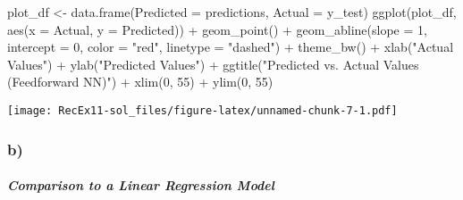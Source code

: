 \documentclass[
]{article}
\newenvironment{Shaded}{\begin{snugshade}}{\end{snugshade}}
\newcommand{\AttributeTok}[1]{\textcolor[rgb]{0.77,0.63,0.00}{#1}}
\newcommand{\DecValTok}[1]{\textcolor[rgb]{0.00,0.00,0.81}{#1}}
\newcommand{\FunctionTok}[1]{\textcolor[rgb]{0.00,0.00,0.00}{#1}}
\newcommand{\NormalTok}[1]{#1}
\newcommand{\OtherTok}[1]{\textcolor[rgb]{0.56,0.35,0.01}{#1}}
\newcommand{\SpecialCharTok}[1]{\textcolor[rgb]{0.00,0.00,0.00}{#1}}
\newcommand{\StringTok}[1]{\textcolor[rgb]{0.31,0.60,0.02}{#1}}
\begin{document}
\begin{Shaded}
\begin{Highlighting}[]
\NormalTok{plot\_df }\OtherTok{\textless{}{-}} \FunctionTok{data.frame}\NormalTok{(}\AttributeTok{Predicted =}\NormalTok{ predictions, }\AttributeTok{Actual =}\NormalTok{ y\_test)}
\FunctionTok{ggplot}\NormalTok{(plot\_df, }\FunctionTok{aes}\NormalTok{(}\AttributeTok{x =}\NormalTok{ Actual, }\AttributeTok{y =}\NormalTok{ Predicted)) }\SpecialCharTok{+}
  \FunctionTok{geom\_point}\NormalTok{() }\SpecialCharTok{+}
  \FunctionTok{geom\_abline}\NormalTok{(}\AttributeTok{slope =} \DecValTok{1}\NormalTok{, }\AttributeTok{intercept =} \DecValTok{0}\NormalTok{, }\AttributeTok{color =} \StringTok{"red"}\NormalTok{, }\AttributeTok{linetype =} \StringTok{"dashed"}\NormalTok{) }\SpecialCharTok{+}
  \FunctionTok{theme\_bw}\NormalTok{() }\SpecialCharTok{+}
  \FunctionTok{xlab}\NormalTok{(}\StringTok{"Actual Values"}\NormalTok{) }\SpecialCharTok{+}
  \FunctionTok{ylab}\NormalTok{(}\StringTok{"Predicted Values"}\NormalTok{) }\SpecialCharTok{+}
  \FunctionTok{ggtitle}\NormalTok{(}\StringTok{"Predicted vs. Actual Values (Feedforward NN)"}\NormalTok{) }\SpecialCharTok{+}
  \FunctionTok{xlim}\NormalTok{(}\DecValTok{0}\NormalTok{, }\DecValTok{55}\NormalTok{) }\SpecialCharTok{+}
  \FunctionTok{ylim}\NormalTok{(}\DecValTok{0}\NormalTok{, }\DecValTok{55}\NormalTok{)}
\end{Highlighting}
\end{Shaded}

\texttt{[image: RecEx11-sol\_files/figure-latex/unnamed-chunk-7-1.pdf]}

\hypertarget{b-2}{%
\subsubsection{b)}\label{b-2}}

\hypertarget{comparison-to-a-linear-regression-model}{%
\subparagraph{Comparison to a Linear Regression
Model}\label{comparison-to-a-linear-regression-model}}
\end{document}

